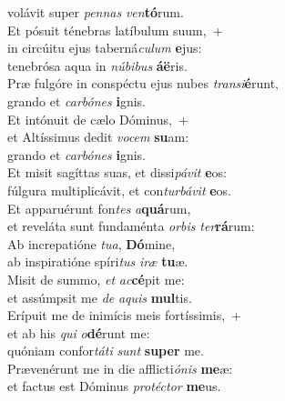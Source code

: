\evenverse volávit super \textit{pen}\textit{nas} \textit{ven}\textbf{tó}rum.\\
\oddverse Et pósuit ténebras latíbulum suum,~+\\
\oddverse  in circúitu ejus taberná\textit{cu}\textit{lum} \textbf{e}jus:~\*\\
\oddverse tenebrósa aqua in \textit{nú}\textit{bi}\textit{bus} \textbf{á}\textbf{ë}ris.\\
\evenverse Præ fulgóre in conspéctu ejus nubes \textit{tran}\textit{si}\textbf{é}runt,~\*\\
\evenverse grando et \textit{car}\textit{bó}\textit{nes} \textbf{i}gnis.\\
\oddverse Et intónuit de cælo Dóminus,~+\\
\oddverse  et Altíssimus dedit \textit{vo}\textit{cem} \textbf{su}am:~\*\\
\oddverse grando et \textit{car}\textit{bó}\textit{nes} \textbf{i}gnis.\\
\evenverse Et misit sagíttas suas, et dissi\textit{pá}\textit{vit} \textbf{e}os:~\*\\
\evenverse fúlgura multiplicávit, et con\textit{tur}\textit{bá}\textit{vit} \textbf{e}os.\\
\oddverse Et apparuérunt fon\textit{tes} \textit{a}\textbf{quá}rum,~\*\\
\oddverse et reveláta sunt fundaménta \textit{or}\textit{bis} \textit{ter}\textbf{rá}rum:\\
\evenverse Ab increpatióne \textit{tu}\textit{a}, \textbf{Dó}mine,~\*\\
\evenverse ab inspiratióne spíri\textit{tus} \textit{i}\textit{ræ} \textbf{tu}æ.\\
\oddverse Misit de summo, \textit{et} \textit{ac}\textbf{cé}pit me:~\*\\
\oddverse et assúmpsit me \textit{de} \textit{a}\textit{quis} \textbf{mul}tis.\\
\evenverse Erípuit me de inimícis meis fortíssimis,~+\\
\evenverse  et ab his \textit{qui} \textit{o}\textbf{dé}runt me:~\*\\
\evenverse quóniam confor\textit{tá}\textit{ti} \textit{sunt} \textbf{su}\textbf{per} me.\\
\oddverse Prævenérunt me in die afflicti\textit{ó}\textit{nis} \textbf{me}æ:~\*\\
\oddverse et factus est Dóminus \textit{pro}\textit{té}\textit{ctor} \textbf{me}us.\\
